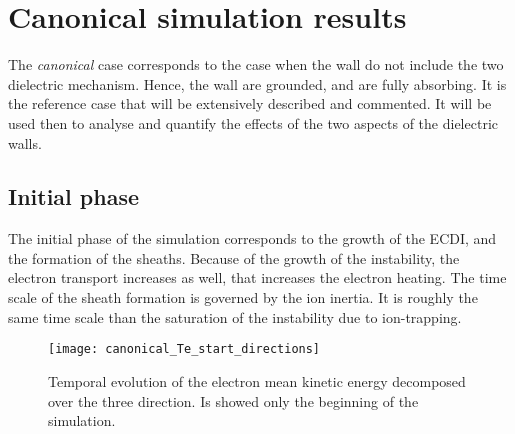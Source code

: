 
\section{Canonical simulation results}
  \label{sec-canonical}
  
  
  The {\it canonical} case corresponds to the case when the wall do not include the two dielectric mechanism.
  Hence, the wall are grounded, and are fully absorbing. 
  It is the reference case that will be extensively described and commented.
  It will be used then to analyse and quantify the effects of the two aspects of the dielectric walls.
  
  \subsection{Initial phase} \label{subsec-initlaphase}
  
  The initial phase of the simulation corresponds to the growth of the \ac{ECDI}, and the formation of the sheaths.
  Because of the growth of the instability, the electron transport increases as well, that increases the electron heating.
  The time scale of the sheath formation is governed by the ion inertia.
  It is roughly the same time scale than the saturation of the instability due to ion-trapping.
  
  \begin{figure}[hbtp]
    \centering
    \texttt{[image: canonical\_Te\_start\_directions]}
    \caption{Temporal evolution of the electron mean kinetic energy decomposed over the three direction. Is showed only the beginning of the simulation.}
    \label{fig-canon_Te_strat}
  \end{figure}
  
